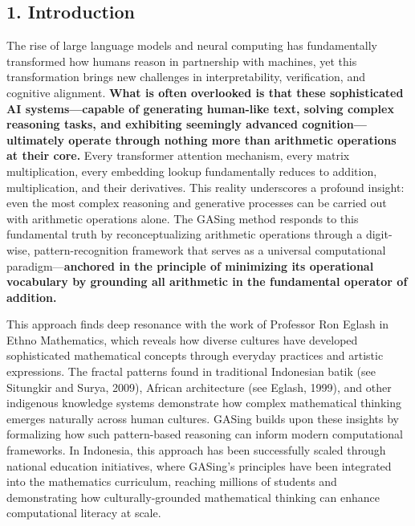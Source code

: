 \subsection{1. Introduction}
The rise of large language models and neural computing has fundamentally transformed how humans reason in partnership with machines, yet this transformation brings new challenges in interpretability, verification, and cognitive alignment. \textbf{What is often overlooked is that these sophisticated AI systems—capable of generating human-like text, solving complex reasoning tasks, and exhibiting seemingly advanced cognition—ultimately operate through nothing more than arithmetic operations at their core.} Every transformer attention mechanism, every matrix multiplication, every embedding lookup fundamentally reduces to addition, multiplication, and their derivatives. This reality underscores a profound insight: even the most complex reasoning and generative processes can be carried out with arithmetic operations alone. The GASing method responds to this fundamental truth by reconceptualizing arithmetic operations through a digit-wise, pattern-recognition framework that serves as a universal computational paradigm—\textbf{anchored in the principle of minimizing its operational vocabulary by grounding all arithmetic in the fundamental operator of addition.}

This approach finds deep resonance with the work of Professor Ron Eglash in Ethno Mathematics, which reveals how diverse cultures have developed sophisticated mathematical concepts through everyday practices and artistic expressions. The fractal patterns found in traditional Indonesian batik (see Situngkir and Surya, 2009), African architecture (see Eglash, 1999), and other indigenous knowledge systems demonstrate how complex mathematical thinking emerges naturally across human cultures. GASing builds upon these insights by formalizing how such pattern-based reasoning can inform modern computational frameworks. In Indonesia, this approach has been successfully scaled through national education initiatives, where GASing's principles have been integrated into the mathematics curriculum, reaching millions of students and demonstrating how culturally-grounded mathematical thinking can enhance computational literacy at scale.

